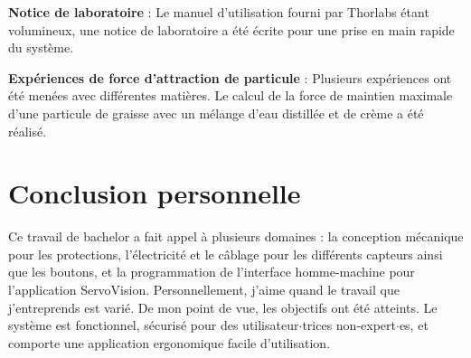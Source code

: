 \textbf{Notice de laboratoire} :
Le manuel d'utilisation fourni par Thorlabs étant volumineux, une notice de laboratoire a été écrite pour une prise en main rapide du système.

\textbf{Expériences de force d'attraction de particule} :
Plusieurs expériences ont été menées avec différentes matières. Le calcul de la force de maintien maximale d'une particule de graisse avec un mélange d'eau distillée et de crème a été réalisé.

\section*{Conclusion personnelle}
Ce travail de bachelor a fait appel à plusieurs domaines : la conception mécanique pour les protections, l'électricité et le câblage pour les différents capteurs ainsi que les boutons, et la programmation de l'interface homme-machine pour l'application ServoVision. Personnellement, j'aime quand le travail que j'entreprends est varié. De mon point de vue, les objectifs ont été atteints. Le système est fonctionnel, sécurisé pour des utilisateur\(\cdot\)trices non-expert\(\cdot\)es, et comporte une application ergonomique facile d'utilisation.
\vfil
\hspace{8cm}\makeatletter\@author\makeatother\par
\hspace{8cm}\begin{minipage}{5cm}
    \printsignature
\end{minipage}